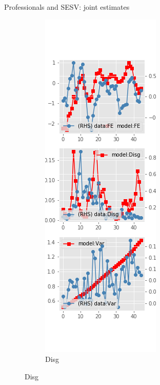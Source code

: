 \documentclass{beamer}
\begin{document}
\begin{frame}{Professionals and SESV: joint estimates}
\begin{figure}[ht]
\begin{subfigure}[b]{0.2\textwidth}
		\end{subfigure}
		\hfill
	\begin{subfigure}[b]{0.2\textwidth}
		\caption{Disg}
		\includegraphics[width=\textwidth, height = 0.8\textheight]{figuresDraft/spf_se_est_sv_joint_diag2.png}
	\end{subfigure}
	\end{figure}
\end{frame}
\end{document}
